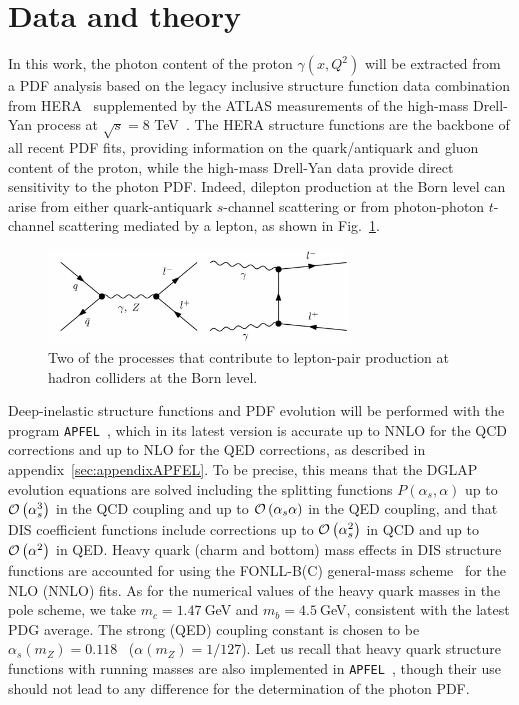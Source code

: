 \section{Data and theory}
\label{sec:theory}

In this work, the photon
content of the proton $\gamma(x,Q^2)$ will be extracted from a PDF analysis based
on the legacy inclusive structure function data combination from HERA~\cite{Abramowicz:2015mha}
supplemented by the ATLAS measurements of the high-mass Drell-Yan process
at $\sqrt{s}=8$ TeV~\cite{Aad:2016zzw}.
%
The HERA structure functions are the backbone of all
recent PDF fits, providing information on the quark/antiquark and gluon content of 
the proton, while the high-mass Drell-Yan data provide
direct sensitivity to the photon PDF.
%
Indeed, dilepton production at the Born level can arise  from either quark-antiquark $s$-channel
scattering or from photon-photon $t$-channel scattering mediated by a lepton,
as shown in Fig.~\ref{fig:photoninduced}.

\begin{figure}[h]
  \begin{center}
    \includegraphics[width=8cm]{plots/photoninduced.pdf}
    \end{center}
  \caption{Two of the processes that contribute to lepton-pair
  production at hadron colliders at the Born level.}
\label{fig:photoninduced}
\end{figure}

Deep-inelastic structure functions and PDF evolution will be performed
with the program {\tt APFEL}~\cite{Bertone:2013vaa}, which in its latest
version is accurate up to NNLO for the QCD corrections and up to
NLO for the QED corrections, as described in appendix~\ref{sec:appendixAPFEL}.
%
To be precise, this means that the DGLAP evolution equations are solved including
the splitting functions $P(\alpha_s,\alpha)$ up to $\mathcal{O}\left( \alpha_s^3\right)$ in the QCD
coupling and up to $\mathcal{O}\left( \alpha_s\alpha\right)$ in the QED coupling,
and that DIS coefficient functions include corrections up to $\mathcal{O}\left( \alpha_s^2\right)$
in QCD and up to $\mathcal{O}\left( \alpha^2\right)$ in QED.
%
Heavy quark (charm and bottom) mass effects in DIS structure functions are accounted
for using the FONLL-B(C) general-mass scheme~\cite{Forte:2010ta}
for the NLO (NNLO) fits.
%
As for the numerical values of the heavy quark masses in the pole scheme,
we take  $m_c=1.47~$GeV and $m_b=4.5~$GeV, consistent with the latest PDG average.
%
The strong (QED) coupling constant is chosen to be  $\alpha_s(m_Z)=0.118$~\cite{PDG}
($\alpha(m_Z)=1/127$).
%
Let us recall that heavy quark structure functions with running masses
are also implemented in {\tt APFEL}~\cite{Bertone:2016ywq},
though their use should not lead to any difference for the determination of the photon PDF.
 
